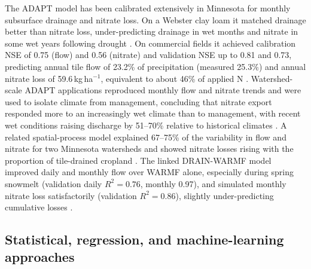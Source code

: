 \documentclass[11pt]{article}
\begin{document}
The ADAPT model has been calibrated extensively in Minnesota for monthly subsurface drainage and nitrate loss. On a Webster clay loam it matched drainage better than nitrate loss, under-predicting drainage in wet months and nitrate in some wet years following drought \parencite{Davis2000}. On commercial fields it achieved calibration NSE of 0.75 (flow) and 0.56 (nitrate) and validation NSE up to 0.81 and 0.73, predicting annual tile flow of 23.2\% of precipitation (measured 25.3\%) and annual nitrate loss of 59.6\,kg\,ha$^{-1}$, equivalent to about 46\% of applied N \parencite{Nangia2008,Nangia2010c}. Watershed-scale ADAPT applications reproduced monthly flow and nitrate trends and were used to isolate climate from management, concluding that nitrate export responded more to an increasingly wet climate than to management, with recent wet conditions raising discharge by 51--70\% relative to historical climates \parencite{Nangia2010,Nangia2010b}. A related spatial-process model explained 67--75\% of the variability in flow and nitrate for two Minnesota watersheds and showed nitrate losses rising with the proportion of tile-drained cropland \parencite{Gowda2007}. The linked DRAIN-WARMF model improved daily and monthly flow over WARMF alone, especially during spring snowmelt (validation daily $R^2 = 0.76$, monthly 0.97), and simulated monthly nitrate loss satisfactorily (validation $R^2 = 0.86$), slightly under-predicting cumulative losses \parencite{Dayyani2010}.

\subsection{Statistical, regression, and machine-learning approaches}
\end{document}
